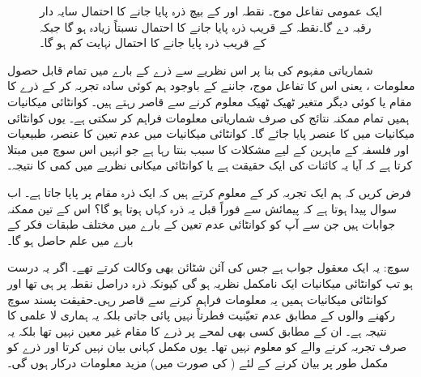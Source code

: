 \begin{figure}
\centering
{}
\caption{
ایک عمومی تفاعل موج۔ نقطہ  اور  کے بیچ ذرہ پایا جانے کا احتمال سایہ دار رقبہ دے گا۔نقطہ  کے قریب ذرہ پایا جانے کا احتمال نسبتاً زیادہ ہو گا جبکہ  کے قریب ذرہ پایا جانے کا احتمال نہایت کم ہو گا۔
}
\label{شکل_تفاعل_موج_احتمال_اور_رقبہ}
\end{figure}
شماریاتی مفہوم کی بنا  پر اس نظریے سے  ذرے  کے بارے میں تمام قابل حصول معلومات ، یعنی اس کا تفاعل موج، جاننے  کے باوجود   ہم  کوئی سادہ تجربہ کر کے ذرے کا مقام یا کوئی دیگر متغیر ٹھیک ٹھیک معلوم کرنے سے قاصر رہتے ہیں۔ کوانٹائی میکانیات ہمیں تمام ممکنہ نتائج کی  صرف شماریاتی معلومات فراہم کر سکتی ہے۔ یوں  کوانٹائی میکانیات میں  کا عنصر پایا جائے گا۔ کوانٹائی میکانیات میں عدم تعین کا عنصر،   طبیعیات اور فلسفہ کے ماہرین کے لیے مشکلات کا سبب بنتا رہا ہے جو انہیں اس سوچ   میں مبتلا کرتا  ہے  کہ آیا یہ کائنات کی ایک حقیقت ہے یا کوانٹائی میکانی نظریے  میں کمی کا نتیجہ۔

 فرض کریں کہ ہم ایک تجربہ کر کے  معلوم کرتے ہیں کہ ایک ذرہ مقام  پر پایا جاتا ہے۔ اب سوال پیدا ہوتا ہے کہ پیمائش سے فوراً قبل یہ ذرہ کہاں ہوتا ہو گا؟ اس کے تین ممکنہ  جوابات ہیں جن سے آپ کو کوانٹائی عدم تعین کے بارے میں مختلف طبقات فکر کے     بارے میں علم حاصل  ہو گا۔ 

\quad {}
 سوچ:    یہ ایک معقول جواب ہے جس کی آئن شٹائن بھی وکالت کرتے تھے۔ اگر یہ درست ہو تب کوانٹائی میکانیات ایک نامکمل نظریہ ہو گی کیونکہ ذرہ دراصل نقطہ  پر ہی تھا اور کوانٹائی میکانیات ہمیں یہ معلومات فراہم کرنے سے قاصر رہی۔حقیقت پسند سوچ رکھنے  والوں کے مطابق عدم تعیّنیت   فطرتاً   نہیں پائی   جاتی  بلکہ  یہ ہماری لا علمی کا نتیجہ ہے۔ ان کے  مطابق  کسی بھی لمحے پر ذرے کا مقام غیر معین نہیں تھا بلکہ یہ صرف تجربہ کرنے والے کو معلوم نہیں تھا۔ یوں  مکمل کہانی بیان نہیں کرتا   اور ذرے کو مکمل طور پر بیان کرنے کے لئے ( کی صورت میں)  مزید معلومات درکار ہوں گی۔

